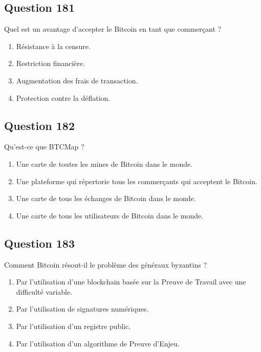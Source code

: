 \documentclass[12pt,a4paper]{article}
\begin{document}
\bigskip


\subsection*{Question 181}
Quel est un avantage d'accepter le Bitcoin en tant que commerçant ?

\begin{enumerate}[label=\Alph*., leftmargin=*]
\item Résistance à la censure.
\item Restriction financière.
\item Augmentation des frais de transaction.
\item Protection contre la déflation.
\end{enumerate}

\bigskip


\subsection*{Question 182}
Qu'est-ce que BTCMap ?

\begin{enumerate}[label=\Alph*., leftmargin=*]
\item Une carte de toutes les mines de Bitcoin dans le monde.
\item Une plateforme qui répertorie tous les commerçants qui acceptent le Bitcoin.
\item Une carte de tous les échanges de Bitcoin dans le monde.
\item Une carte de tous les utilisateurs de Bitcoin dans le monde.
\end{enumerate}

\bigskip


\subsection*{Question 183}
Comment Bitcoin résout-il le problème des généraux byzantins ?

\begin{enumerate}[label=\Alph*., leftmargin=*]
\item Par l'utilisation d'une blockchain basée sur la Preuve de Travail avec une difficulté variable.
\item Par l'utilisation de signatures numériques.
\item Par l'utilisation d'un registre public.
\item Par l'utilisation d'un algorithme de Preuve d'Enjeu.
\end{enumerate}
\end{document}
